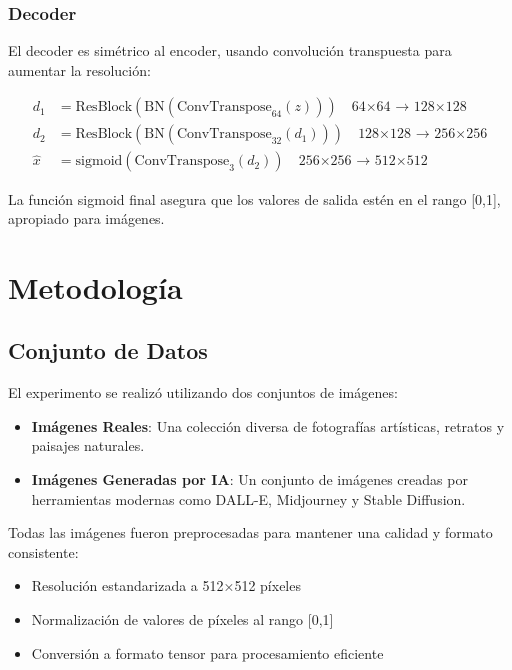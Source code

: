 \documentclass[conference]{IEEEtran}
\begin{document}
\subsubsection{Decoder}
El decoder es simétrico al encoder, usando convolución transpuesta para aumentar la resolución:

\begin{equation}
\begin{split}
d_1 &= \text{ResBlock}(\text{BN}(\text{ConvTranspose}_{64}(z))) \quad \text{64×64 → 128×128} \\
d_2 &= \text{ResBlock}(\text{BN}(\text{ConvTranspose}_{32}(d_1))) \quad \text{128×128 → 256×256} \\
\hat{x} &= \text{sigmoid}(\text{ConvTranspose}_{3}(d_2)) \quad \text{256×256 → 512×512}
\end{split}
\end{equation}

La función sigmoid final asegura que los valores de salida estén en el rango [0,1], apropiado para imágenes.

\section{Metodología}
\subsection{Conjunto de Datos}
El experimento se realizó utilizando dos conjuntos de imágenes:

\begin{itemize}
    \item \textbf{Imágenes Reales}: Una colección diversa de fotografías artísticas, retratos y paisajes naturales.
    \item \textbf{Imágenes Generadas por IA}: Un conjunto de imágenes creadas por herramientas modernas como DALL-E, Midjourney y Stable Diffusion.
\end{itemize}

Todas las imágenes fueron preprocesadas para mantener una calidad y formato consistente:
\begin{itemize}
    \item Resolución estandarizada a 512×512 píxeles
    \item Normalización de valores de píxeles al rango [0,1]
    \item Conversión a formato tensor para procesamiento eficiente
\end{itemize}
\end{document}
